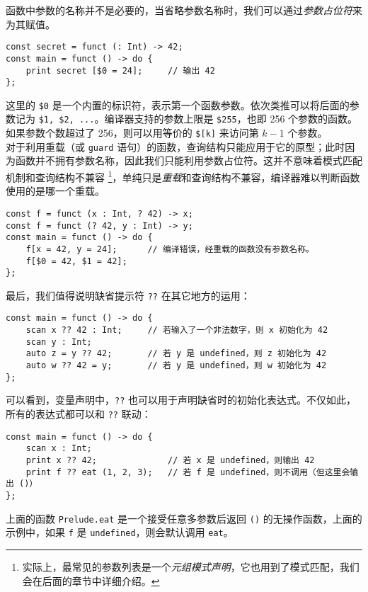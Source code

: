 函数中参数的名称并不是必要的，当省略参数名称时，我们可以通过\emph{参数占位符}来为其赋值。

\begin{lstlisting}
const secret = funct (: Int) -> 42;
const main = funct () -> do {
	print secret [$0 = 24];		// 输出 42
};
\end{lstlisting}

这里的 \texttt{\$0} 是一个内置的标识符，表示第一个函数参数。依次类推可以将后面的参数记为 \texttt{\$1, \$2, ...}。编译器支持的参数上限是 \texttt{\$255}，也即 256 个参数的函数。如果参数个数超过了 256，则可以用等价的 \texttt{\$[k]} 来访问第 $k-1$ 个参数。 \\

对于利用重载（或 \lstinline!guard! 语句）的函数，查询结构只能应用于它的原型；此时因为函数并不拥有参数名称，因此我们只能利用参数占位符。这并不意味着模式匹配机制和查询结构不兼容 \footnote{实际上，最常见的参数列表是一个\emph{元组模式声明}，它也用到了模式匹配，我们会在后面的章节中详细介绍。}，单纯只是\emph{重载}和查询结构不兼容，编译器难以判断函数使用的是哪一个重载。

\begin{lstlisting}
const f = funct (x : Int, ? 42) -> x;
const f = funct (? 42, y : Int) -> y;
const main = funct () -> do {
	f[x = 42, y = 24];		// 编译错误，经重载的函数没有参数名称。
	f[$0 = 42, $1 = 42];
};
\end{lstlisting}

最后，我们值得说明缺省提示符 \lstinline!??! 在其它地方的运用：

\begin{lstlisting}
const main = funct () -> do {
	scan x ?? 42 : Int;		// 若输入了一个非法数字，则 x 初始化为 42
	scan y : Int;
	auto z = y ?? 42;		// 若 y 是 undefined，则 z 初始化为 42
	auto w ?? 42 = y;		// 若 y 是 undefined，则 w 初始化为 42
};
\end{lstlisting}

可以看到，变量声明中，\lstinline!??! 也可以用于声明缺省时的初始化表达式。不仅如此，所有的表达式都可以和 \lstinline!??! 联动：

\begin{lstlisting}
const main = funct () -> do {
	scan x : Int;
	print x ?? 42;				// 若 x 是 undefined，则输出 42
	print f ?? eat (1, 2, 3);	// 若 f 是 undefined，则不调用（但这里会输出 ()）
};
\end{lstlisting}

上面的函数 \lstinline!Prelude.eat! 是一个接受任意多参数后返回 \lstinline!()! 的无操作函数，上面的示例中，如果 \lstinline!f! 是 \lstinline!undefined!，则会默认调用 \lstinline!eat!。 \\

